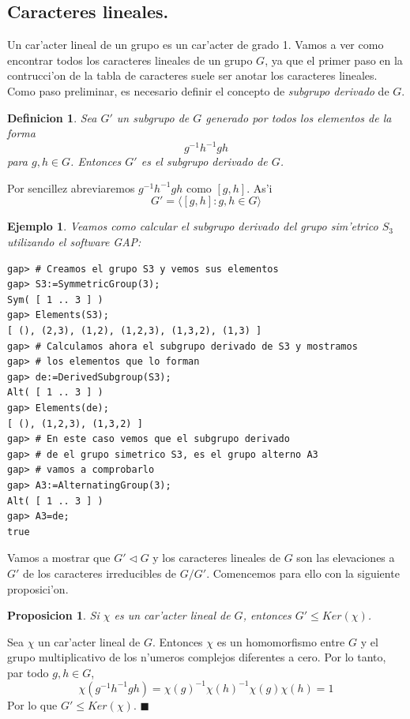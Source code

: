 \documentclass[a4paper,openright,12pt]{book}
\numberwithin{equation}{section} %
\newtheorem{proposicion}{Proposicion}[section] %
\newtheorem{definicion}{Definicion}[section] %
\newtheorem{ejemplo}{Ejemplo}[section] %
\newenvironment{proof}{\noindent{\it Demostracion:}}{\hfill$\blacksquare$} %
\begin{document}
\subsection{Caracteres lineales.}
Un car'acter lineal de un grupo es un car'acter de grado 1. Vamos a ver como encontrar todos los caracteres lineales de un grupo $G$, ya que el primer paso en la contrucci'on de la tabla de caracteres suele ser anotar los caracteres lineales.\\
Como paso preliminar, es necesario definir el concepto de \emph{subgrupo derivado} de $G$.	
\begin{definicion}
Sea $G'$ un subgrupo de $G$ generado por todos los elementos de la forma 
\[
g^{-1}h^{-1}gh
\]
para $g, h \in G$. Entonces $G'$ es el subgrupo derivado de $G$.
\end{definicion}
Por sencillez abreviaremos $g^{-1}h^{-1}gh$ como $[g,h]$. As'i 
\[
G'=\langle [g,h] : g, h \in G \rangle
\]
\begin{ejemplo}
Veamos como calcular el subgrupo derivado del grupo sim'etrico $S_{3}$ utilizando el software GAP:
\begin{verbatim}
gap> # Creamos el grupo S3 y vemos sus elementos
gap> S3:=SymmetricGroup(3);
Sym( [ 1 .. 3 ] )
gap> Elements(S3);
[ (), (2,3), (1,2), (1,2,3), (1,3,2), (1,3) ]
gap> # Calculamos ahora el subgrupo derivado de S3 y mostramos
gap> # los elementos que lo forman
gap> de:=DerivedSubgroup(S3);
Alt( [ 1 .. 3 ] )
gap> Elements(de);
[ (), (1,2,3), (1,3,2) ]
gap> # En este caso vemos que el subgrupo derivado
gap> # de el grupo simetrico S3, es el grupo alterno A3
gap> # vamos a comprobarlo
gap> A3:=AlternatingGroup(3);
Alt( [ 1 .. 3 ] )
gap> A3=de;
true
\end{verbatim}
\end{ejemplo}
Vamos a mostrar que $G' \triangleleft G$ y los caracteres lineales de $G$ son las elevaciones a $G'$ de los caracteres irreducibles de $G/G'$. Comencemos para ello con la siguiente proposici'on.
\begin{proposicion}
Si $\chi$ es un car'acter lineal de $G$, entonces $G' \leq Ker (\chi)$.
\end{proposicion}
\begin{proof}
Sea $\chi$ un car'acter lineal de $G$. Entonces $\chi$ es un homomorfismo entre $G$ y el grupo multiplicativo de los n'umeros complejos diferentes a cero. Por lo tanto, par todo $g, h \in G$,
\[
\chi (g^{-1}h^{-1}gh)= \chi (g)^{-1} \chi (h)^{-1} \chi (g) \chi (h) = 1 
\]
Por lo que $G' \leq Ker (\chi)$.
\end{proof}
\end{document}
